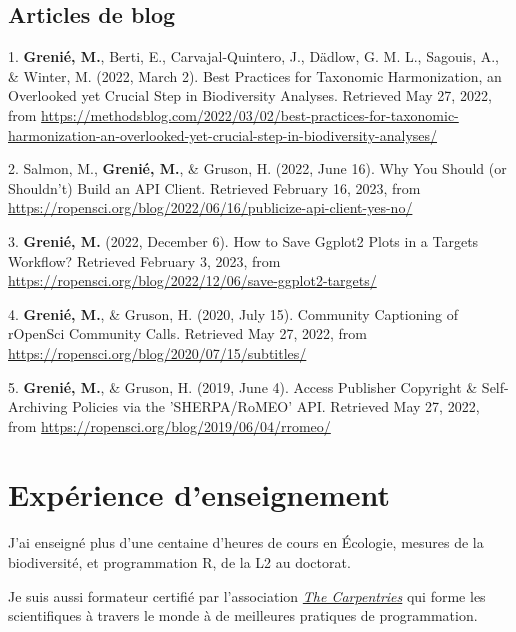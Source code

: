 \documentclass[10pt,a4paper,]{article}
\begin{document}
\hypertarget{articles-de-blog}{%
\subsection{Articles de blog}\label{articles-de-blog}}

\hypertarget{bibliography}{}
\leavevmode{}%
1. \textbf{Grenié, M.}, Berti, E., Carvajal-Quintero, J., Dädlow, G. M.
L., Sagouis, A., \& Winter, M. (2022, March 2). Best Practices for
Taxonomic Harmonization, an Overlooked yet Crucial Step in Biodiversity
Analyses. Retrieved May 27, 2022, from
\url{https://methodsblog.com/2022/03/02/best-practices-for-taxonomic-harmonization-an-overlooked-yet-crucial-step-in-biodiversity-analyses/}

\leavevmode{}%
2. Salmon, M., \textbf{Grenié, M.}, \& Gruson, H. (2022, June 16). Why
You Should (or Shouldn't) Build an API Client. Retrieved February 16,
2023, from
\url{https://ropensci.org/blog/2022/06/16/publicize-api-client-yes-no/}

\leavevmode{}%
3. \textbf{Grenié, M.} (2022, December 6). How to Save Ggplot2 Plots in
a Targets Workflow? Retrieved February 3, 2023, from
\url{https://ropensci.org/blog/2022/12/06/save-ggplot2-targets/}

\leavevmode{}%
4. \textbf{Grenié, M.}, \& Gruson, H. (2020, July 15). Community
Captioning of rOpenSci Community Calls. Retrieved May 27, 2022, from
\url{https://ropensci.org/blog/2020/07/15/subtitles/}

\leavevmode{}%
5. \textbf{Grenié, M.}, \& Gruson, H. (2019, June 4). Access Publisher
Copyright \& Self-Archiving Policies via the 'SHERPA/RoMEO' API.
Retrieved May 27, 2022, from
\url{https://ropensci.org/blog/2019/06/04/rromeo/}

\hypertarget{expuxe9rience-denseignement}{%
\section{Expérience d'enseignement}\label{expuxe9rience-denseignement}}

J'ai enseigné plus d'une centaine d'heures de cours en Écologie, mesures
de la biodiversité, et programmation R, de la L2 au doctorat.

Je suis aussi formateur certifié par l'association
\href{https://carpentries.org/}{\emph{The Carpentries}} qui forme les
scientifiques à travers le monde à de meilleures pratiques de
programmation.
\end{document}
